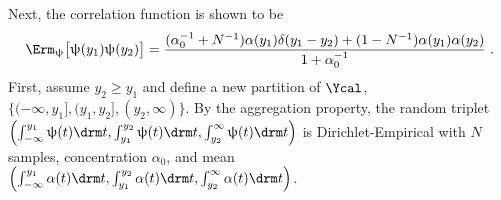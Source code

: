 \documentclass[12pt]{report}
\begin{document}
Next, the correlation function is shown to be 
\begin{equation}
\Erm_{\uppsi}\big[ \uppsi(y_1)\uppsi(y_2) \big] = \frac{(\alpha_0^{-1} + N^{-1}) \alpha(y_1) \delta(y_1-y_2) + (1 - N^{-1}) \alpha(y_1) \alpha(y_2)}{1 + \alpha_0^{-1}} \;.
\end{equation}
First, assume $y_2 \geq y_1$ and define a new partition of $\Ycal$, $\big\{ (-\infty,y_1], (y_1,y_2], (y_2,\infty) \big\}$. By the aggregation property, the random triplet $\left( \int_{-\infty}^{y_1} \uppsi(t) {\drm}t, \int_{y_1}^{y_2} \uppsi(t) {\drm}t, \int_{y_2}^{\infty} \uppsi(t) {\drm}t \right)$ is Dirichlet-Empirical with $N$ samples, concentration $\alpha_0$, and mean $\left( \int_{-\infty}^{y_1} \alpha(t) {\drm}t, \int_{y_1}^{y_2} \alpha(t) {\drm}t, \int_{y_2}^{\infty} \alpha(t) {\drm}t \right)$.
\end{document}
